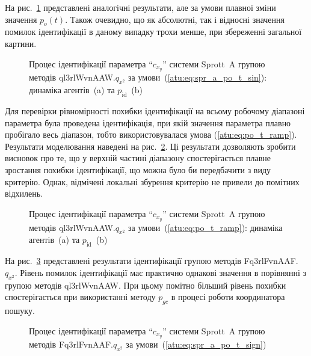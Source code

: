 На рис.~\ref{atu:f:spr_a_id_ql3rlWvnAAW_q_x2_sin} представлені аналогічні
результати, але за умови плавної зміни значення
$p_o(t)$. Також очевидно, що як абсолютні, так і відносні значення
помилок ідентифікації в даному випадку трохи менше, при
збереженні загальної картини.

\begin{figure}[htb!]
  \caption{Процес ідентифікації параметра ``$c_{x_y}$'' системи Sprott~A групою методів ql3rlWvnAAW.$q_{x^2}$ за умови~(\ref{atu:eq:spr_a_po_t_sin}): динаміка агентів~(a) та $p_\mathrm{id}$~(b)}
  \label{atu:f:spr_a_id_ql3rlWvnAAW_q_x2_sin}
\end{figure}

Для перевірки рівномірності похибки ідентифікації на всьому
робочому діапазоні параметра була проведена ідентифікація,
при якій значення параметра плавно пробігало весь діапазон,
тобто використовувалася умова (\ref{atu:eq:po_t_ramp}). Результати
моделювання наведені на рис.~\ref{atu:f:spr_a_id_ql3rlWvnAAW_q_x2_ramp}. Ці
результати дозволяють зробити висновок про те, що у верхній
частині діапазону спостерігається плавне зростання похибки
ідентифікації, що можна було би передбачити з виду критерію. Однак, відмічені
локальні збурення критерію не привели до помітних відхилень.


\begin{figure}[htb!]
  \caption{Процес ідентифікації параметра ``$c_{x_y}$'' системи Sprott~A групою методів ql3rlWvnAAW.$q_{x^2}$ за умови~(\ref{atu:eq:po_t_ramp}): динаміка агентів~(a) та $p_\mathrm{id}$~(b)}
  \label{atu:f:spr_a_id_ql3rlWvnAAW_q_x2_ramp}
\end{figure}

На рис.~\ref{atu:f:spr_a_id_Fq3rlFvnAAF_q_x2_sign} представлені результати
ідентифікації групою методів Fq3rlFvnAAF.$q_{x^2}$. Рівень помилок ідентифікації має практично однакові
значення в порівнянні з групою методів ql3rlWvnAAW. При цьому помітно
більший рівень похибки спостерігається при використанні методу
$p_{gc}$ в процесі роботи координатора пошуку.


\begin{figure}[htb!]
  \caption{Процес ідентифікації параметра ``$c_{x_y}$'' системи Sprott~A групою методів Fq3rlFvnAAF.$q_{x^2}$ за умови~(\ref{atu:eq:spr_a_po_t_sign})}
  \label{atu:f:spr_a_id_Fq3rlFvnAAF_q_x2_sign}
\end{figure}

